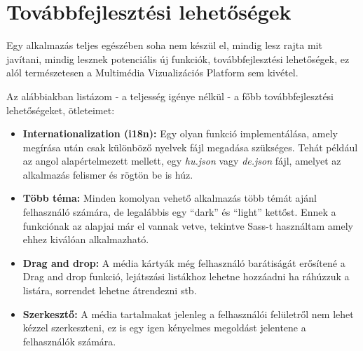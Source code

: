 \chapter{Továbbfejlesztési lehetőségek}
\label{appx:further_development}

Egy alkalmazás teljes egészében soha nem készül el, mindig lesz rajta mit javítani, mindig lesznek potenciális új funkciók, továbbfejlesztési lehetőségek, ez alól természetesen a Multimédia Vizualizációs Platform sem kivétel.

Az alábbiakban listázom - a teljesség igénye nélkül - a főbb továbbfejlesztési lehetőségeket, ötleteimet:
\begin{itemize}
    \item {\textbf {Internationalization (i18n): }} Egy olyan funkció implementálása, amely megírása után csak különböző nyelvek fájl megadása szükséges. Tehát például az angol alapértelmezett mellett, egy {\it hu.json} vagy {\it de.json} fájl, amelyet az alkalmazás felismer és rögtön be is húz.
	\item {\textbf {Több téma: }} Minden komolyan vehető alkalmazás több témát ajánl felhasználó számára, de legalábbis egy ``dark'' és ``light'' kettőst. Ennek a funkciónak az alapjai már el vannak vetve, tekintve Sass-t használtam amely ehhez kiválóan alkalmazható.
	\item {\textbf {Drag and drop: }} A média kártyák még felhasználó barátiságát erősítené a Drag and drop funkció, lejátszási listákhoz lehetne hozzáadni ha ráhúzzuk a listára, sorrendet lehetne átrendezni stb.
	\item {\textbf {Szerkesztő: }} A média tartalmakat jelenleg a felhasználói felületről nem lehet kézzel szerkeszteni, ez is egy igen kényelmes megoldást jelentene a felhasználók számára.
\end{itemize}
